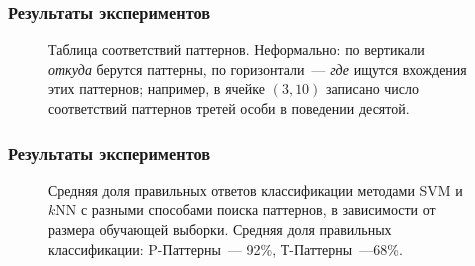 \documentclass[smaller]{beamer}
\begin{document}
\begin{frame}
  \frametitle{Результаты экспериментов}
\begin{figure}[H]
\noindent{}
\caption{ Таблица соответствий паттернов. Неформально: 
по вертикали {\em откуда} берутся паттерны, по горизонтали~--- {\em где} ищутся вхождения этих паттернов; например, в ячейке $(3,10)$ записано
число соответствий паттернов третей особи в поведении десятой.}

\end{figure}
\end{frame}

\begin{frame}
  \frametitle{Результаты экспериментов}
\begin{figure}[H]
\noindent{}
\caption{ Средняя доля правильных ответов классификации методами SVM и $k$NN с разными способами поиска паттернов, в зависимости от размера
обучающей выборки. Средняя доля правильных классификации: P-Паттерны~--- 92\%, Т-Паттерны~---68\%.  }
\end{figure}
\end{frame}
\end{document}
